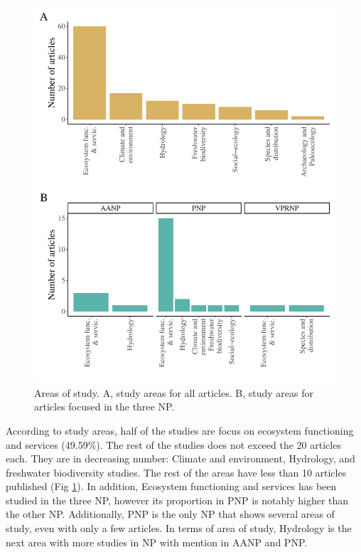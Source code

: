 \documentclass[]{article}
\begin{document}
\begin{figure}
\centering
\includegraphics{Review_and_climate_files/figure-latex/Areas-1.pdf}
\caption{\label{fig:Areas}Areas of study. A, study areas for all articles. B, study areas for articles focused in the three NP.}
\end{figure}

According to study areas, half of the studies are focus on ecosystem functioning and services (49.59\%). The rest of the studies does not exceed the 20 articles each. They are in decreasing number: Climate and environment, Hydrology, and freshwater biodiversity studies. The rest of the areas have less than 10 articles published (Fig \ref{fig:Areas}).
In addition, Ecosystem functioning and services has been studied in the three NP, however its proportion in PNP is notably higher than the other NP. Additionally, PNP is the only NP that shows several areas of study, even with only a few articles. In terms of area of study, Hydrology is the next area with more studies in NP with mention in AANP and PNP.
\end{document}
